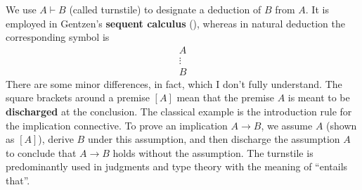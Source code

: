 \begin{notation}
We use $A \vdash B$ (called turnstile) to designate a deduction of $B$ from $A$. 
It is employed in Gentzen’s \textbf{sequent calculus} (\cite{girard1989proofs}), 
whereas in natural deduction the corresponding symbol is\[
\begin{array}{c}
A \\
\vdots \\
B
\end{array}
\]
There are some minor differences, in fact, which I don't fully understand.
The square brackets around a premise $[A]$ mean that the premise $A$ is meant to 
be \textbf{discharged} at the conclusion. The classical example is the 
introduction rule for the implication connective.
To prove an implication $A \to B$, we assume $A$ 
(shown as $[A]$), derive $B$ under this assumption, and then discharge the 
assumption $A$ to conclude that $A \to B$ holds without the assumption. 
The turnstile is predominantly used in judgments and type theory with 
the meaning of ``entails that''. 
\end{notation}

